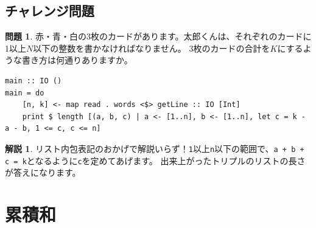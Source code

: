 \documentclass[12pt,a4paper,dvipdfmx,fleqn]{article}%
\theoremstyle{definition}
\newtheorem*{toi*}{問題}
\theoremstyle{definition}
\newtheorem*{ans*}{解説}
\theoremstyle{definition}
\begin{document}
\subsection{チャレンジ問題}\label{チャレンジ問題1}
\begin{toi*}
    赤・青・白の3枚のカードがあります。太郎くんは、それぞれのカードに1以上$N$以下の整数を書かなければなりません。
    3枚のカードの合計を$K$にするような書き方は何通りありますか。
\end{toi*}
\begin{lstlisting}[caption=A05.hs,label=A05]
main :: IO ()
main = do
    [n, k] <- map read . words <$> getLine :: IO [Int]
    print $ length [(a, b, c) | a <- [1..n], b <- [1..n], let c = k - a - b, 1 <= c, c <= n]
\end{lstlisting}
\begin{ans*}
    リスト内包表記のおかげで解説いらず！\texttt{1}以上\texttt{n}以下の範囲で、\texttt{a + b + c = k}となるように\texttt{c}を定めてあげます。
    出来上がったトリプルのリストの長さが答えになります。
\end{ans*}
\section{累積和}\label{累積和}
\end{document}
